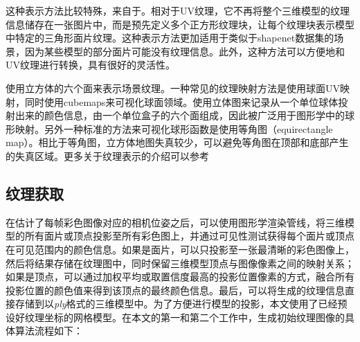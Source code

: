 \vspace*{2mm}这种表示方法比较特殊，来自于。相对于UV纹理，它不再将整个三维模型的纹理信息储存在一张图片中，而是预先定义多个正方形纹理块，让每个纹理块表示模型中特定的三角形面片纹理。这种表示方法更加适用于类似于shapenet数据集的场景，因为某些模型的部分面片可能没有纹理信息。此外，这种方法可以方便地和UV纹理进行转换，具有很好的灵活性。\par
\vspace*{2mm}使用立方体的六个面来表示场景纹理。一种常见的纹理映射方法是使用球面UV映射，同时使用cubemaps来可视化球面领域。使用立体图来记录从一个单位球体投射出来的颜色信息，由一个单位盒子的六个面组成，因此被广泛用于图形学中的球形映射。另外一种标准的方法来可视化球形函数是使用等角图（equirectangle map）。相比于等角图，立方体地图失真较少，可以避免等角图在顶部和底部产生的失真区域。更多关于纹理表示的介绍可以参考\par
\subsection{纹理获取}
在估计了每帧彩色图像对应的相机位姿之后，可以使用图形学渲染管线，将三维模型的所有面片或顶点投影至所有彩色图上，并通过可见性测试获得每个面片或顶点在可见范围内的颜色信息。如果是面片，可以只投影至一张最清晰的彩色图像上，然后将结果存储在纹理图中，同时保留三维模型顶点与图像像素之间的映射关系；如果是顶点，可以通过加权平均或取置信度最高的投影位置像素的方式，融合所有投影位置的颜色值来得到该顶点的最终颜色信息。最后，可以将生成的纹理信息直接存储到以\emph{ply}格式的三维模型中。为了方便进行模型的投影，本文使用了已经预设好纹理坐标的网格模型。在本文的第一和第二个工作中，生成初始纹理图像的具体算法流程如下：\par




